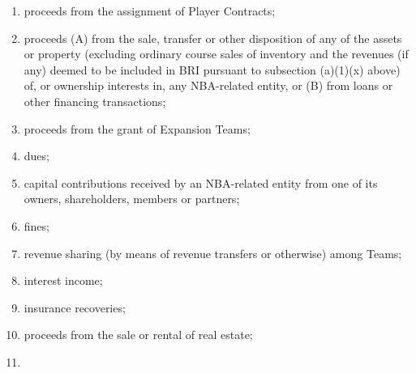 \documentclass[
]{book}
\providecommand{\tightlist}{%
  \setlength{\itemsep}{0pt}\setlength{\parskip}{0pt}}
\begin{document}
\begin{enumerate}
\begin{enumerate}
    \begin{enumerate}
    \def\labelenumiii{(\roman{enumiii})}
    \tightlist
    \item
      proceeds from the assignment of Player Contracts;
    \item
      proceeds (A) from the sale, transfer or other disposition of any of the assets or property (excluding ordinary course sales of inventory and the revenues (if any) deemed to be included in BRI pursuant to subsection (a)(1)(x) above) of, or ownership interests in, any NBA-related entity, or (B) from loans or other financing transactions;
    \item
      proceeds from the grant of Expansion Teams;
    \item
      dues;
    \item
      capital contributions received by an NBA-related entity from one of its owners, shareholders, members or partners;
    \item
      fines;
    \item
      revenue sharing (by means of revenue transfers or otherwise) among Teams;
    \item
      interest income;
    \item
      insurance recoveries;
    \item
      proceeds from the sale or rental of real estate;
    \item

\end{enumerate}
\end{enumerate}
\end{enumerate}
\end{document}

